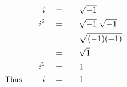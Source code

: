 \begin{alignat*}{5}
&\,&i\quad&=\quad&&\sqrt{-1}\\
&\,&i^2\quad&=&&\sqrt{-1}.\sqrt{-1}\\
&\,&\,&=&&\sqrt{(-1)(-1)}\\
&\,&\,&=&&\sqrt{1}\\
&\,&i^2\quad&=&&1\\
&\small\text{Thus}\normalsize\quad&i\quad&=&&1
\end{alignat*}
